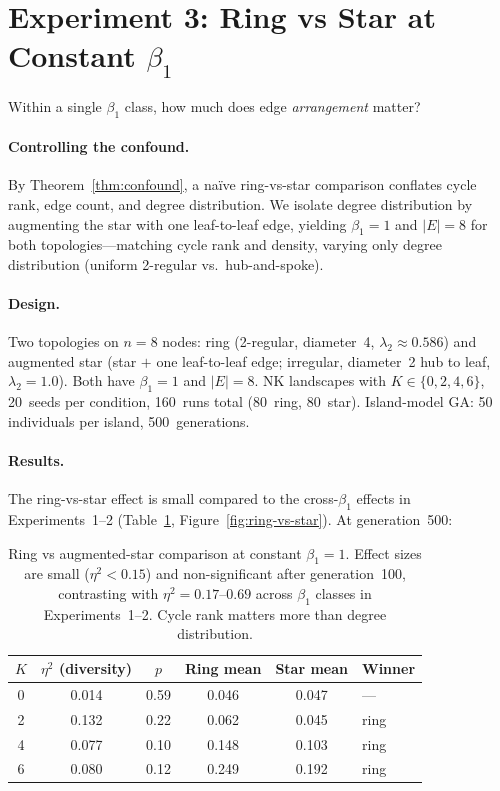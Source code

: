 \documentclass[runningheads]{llncs}
\begin{document}
\section{Experiment 3: Ring vs Star at Constant $\beta_1$}
\label{sec:exp3}

Within a single $\beta_1$ class, how much does edge \emph{arrangement}
matter?

\paragraph{Controlling the confound.}
By Theorem~\ref{thm:confound}, a na\"ive ring-vs-star comparison conflates cycle rank, edge count, and degree distribution. We isolate degree distribution by augmenting the star with one leaf-to-leaf edge, yielding $\beta_1 = 1$ and $|E| = 8$ for both topologies---matching cycle rank and density, varying only degree distribution (uniform 2-regular vs.\ hub-and-spoke).

\paragraph{Design.}
Two topologies on $n = 8$ nodes: ring (2-regular, diameter~4,
$\lambda_2 \approx 0.586$) and augmented star (star $+$ one
leaf-to-leaf edge; irregular, diameter~2 hub to leaf,
$\lambda_2 = 1.0$). Both have $\beta_1 = 1$ and $|E| = 8$. NK
landscapes with $K \in \{0, 2, 4, 6\}$, 20~seeds per condition,
160~runs total (80~ring, 80~star). Island-model GA: 50 individuals
per island, 500~generations.

\paragraph{Results.}
The ring-vs-star effect is small compared to the cross-$\beta_1$
effects in Experiments~1--2 (Table~\ref{tab:ring-star}, Figure~\ref{fig:ring-vs-star}). At
generation~500:

\begin{table}[t]
\centering
\caption{Ring vs augmented-star comparison at constant $\beta_1 = 1$. Effect
sizes are small ($\eta^2 < 0.15$) and non-significant after
generation~100, contrasting with $\eta^2 = 0.17$--$0.69$ across
$\beta_1$ classes in Experiments~1--2. Cycle rank matters more than
degree distribution.}
\label{tab:ring-star}
\begin{tabular}{@{}cccccl@{}}
\toprule
$K$ & $\eta^2$ (diversity) & $p$ & Ring mean & Star mean & Winner \\
\midrule
0 & 0.014 & 0.59 & 0.046 & 0.047 & --- \\
2 & 0.132 & 0.22 & 0.062 & 0.045 & ring \\
4 & 0.077 & 0.10 & 0.148 & 0.103 & ring \\
6 & 0.080 & 0.12 & 0.249 & 0.192 & ring \\
\bottomrule
\end{tabular}
\end{table}
\end{document}
